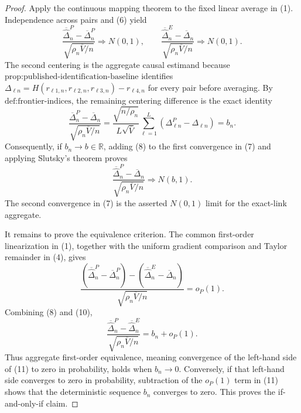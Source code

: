\documentclass{article}
\begin{document}
\begin{proof}
Apply the continuous mapping theorem to the fixed linear average in (1).
Independence across pairs and (6) yield
\[
 \frac{\overline{\widehat\Delta}^{P}_{n}-\overline\Delta^{P}_{n}}
      {\sqrt{\rho_n\overline V/n}}
 \Rightarrow N(0,1),
 \qquad
 \frac{\overline{\widehat\Delta}^{E}_{n}-\overline\Delta_n}
      {\sqrt{\rho_n\overline V/n}}
 \Rightarrow N(0,1).
 \tag{7}
\]
The second centering is the aggregate causal estimand because
\(\text{prop:published-identification-baseline}\) identifies
\(\Delta_{\ell n}=H(r_{\ell1,n},r_{\ell2,n},r_{\ell3,n})-r_{\ell4,n}\)
for every pair before averaging.  By \(\text{def:frontier-indices}\), the
remaining centering difference is the exact identity
\[
 \frac{\overline\Delta^{P}_{n}-\overline\Delta_n}
      {\sqrt{\rho_n\overline V/n}}
 =\frac{\sqrt{n/\rho_n}}{L\sqrt{\overline V}}
    \sum_{\ell=1}^{L}(\Delta^{P}_{\ell n}-\Delta_{\ell n})
 =b_n.
 \tag{8}
\]
Consequently, if \(b_n\to b\in\mathbb R\), adding (8) to the first convergence
in (7) and applying Slutsky's theorem proves
\[
 \frac{\overline{\widehat\Delta}^{P}_{n}-\overline\Delta_n}
      {\sqrt{\rho_n\overline V/n}}
 \Rightarrow N(b,1).
 \tag{9}
\]
The second convergence in (7) is the asserted \(N(0,1)\) limit for the
exact-link aggregate.

It remains to prove the equivalence criterion.  The common first-order
linearization in (1), together with the uniform gradient comparison and
Taylor remainder in (4), gives
\[
 \frac{
   (\overline{\widehat\Delta}^{P}_{n}-\overline\Delta^{P}_{n})
   -(\overline{\widehat\Delta}^{E}_{n}-\overline\Delta_n)}
      {\sqrt{\rho_n\overline V/n}}
 =o_P(1).
 \tag{10}
\]
Combining (8) and (10),
\[
 \frac{\overline{\widehat\Delta}^{P}_{n}
       -\overline{\widehat\Delta}^{E}_{n}}
      {\sqrt{\rho_n\overline V/n}}
 =b_n+o_P(1).
 \tag{11}
\]
Thus aggregate first-order equivalence, meaning convergence of the left-hand
side of (11) to zero in probability, holds when \(b_n\to0\).  Conversely, if
that left-hand side converges to zero in probability, subtraction of the
\(o_P(1)\) term in (11) shows that the deterministic sequence \(b_n\) converges
to zero.  This proves the if-and-only-if claim.


\end{proof}
\end{document}
